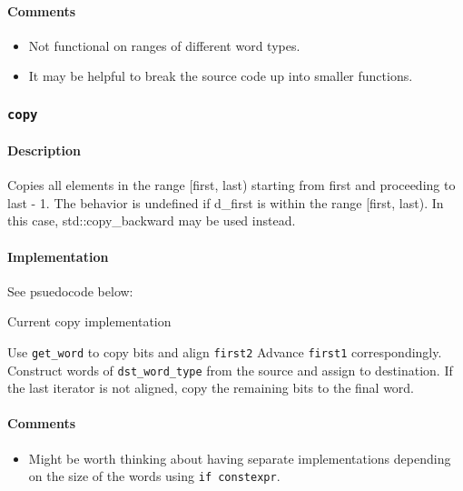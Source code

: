 \documentclass[letterpaper, 8pt, twocolumn]{article}
\begin{document}
\paragraph{Comments}
\begin{itemize}
    \item Not functional on ranges of different word types. 
    \item It may be helpful to break the source code up into smaller functions. 
\end{itemize}

\subsubsection{\texttt{copy}}
\label{subsubsec:copy}
\paragraph{Description}
Copies all elements in the range [first, last) starting from first and 
proceeding to last - 1. The behavior is undefined if d\_first is within the 
range [first, last). In this case, std::copy\_backward may be used instead.

\paragraph{Implementation}
See psuedocode below:
\begin{algorithm}[H]
    \caption{Current copy implementation}
    \begin{algorithmic}[1]
            \State Use \texttt{get\_word} to copy bits and align \texttt{first2}
            \State Advance \texttt{first1} correspondingly.
        \EndIf
            \State Construct words of \texttt{dst\_word\_type}
            from the source and assign to destination.
        \EndWhile
        \State If the last iterator is not aligned, copy the remaining bits to 
            the final word.
        \EndFunction
    \end{algorithmic}
\end{algorithm}
\paragraph{Comments}
\begin{itemize}
    \item Might be worth thinking about having separate implementations 
        depending on the size of the words using \texttt{if constexpr}.
\end{itemize}
\end{document}
